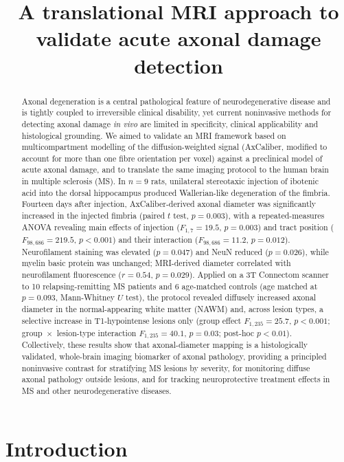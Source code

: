 \documentclass[11pt]{article}
\title{A translational MRI approach to validate acute axonal damage detection}
\date{}
\begin{document}
\maketitle

\begin{abstract}
Axonal degeneration is a central pathological feature of neurodegenerative disease and is tightly coupled to irreversible clinical disability, yet current noninvasive methods for detecting axonal damage \emph{in vivo} are limited in specificity, clinical applicability and histological grounding. We aimed to validate an MRI framework based on multicompartment modelling of the diffusion-weighted signal (AxCaliber, modified to account for more than one fibre orientation per voxel) against a preclinical model of acute axonal damage, and to translate the same imaging protocol to the human brain in multiple sclerosis (MS). In $n=9$ rats, unilateral stereotaxic injection of ibotenic acid into the dorsal hippocampus produced Wallerian-like degeneration of the fimbria. Fourteen days after injection, AxCaliber-derived axonal diameter was significantly increased in the injected fimbria (paired $t$ test, $p=0.003$), with a repeated-measures ANOVA revealing main effects of injection ($F_{1,7}=19.5$, $p=0.003$) and tract position ($F_{98,686}=219.5$, $p<0.001$) and their interaction ($F_{98,686}=11.2$, $p=0.012$). Neurofilament staining was elevated ($p=0.047$) and NeuN reduced ($p=0.026$), while myelin basic protein was unchanged; MRI-derived diameter correlated with neurofilament fluorescence ($r=0.54$, $p=0.029$). Applied on a 3T Connectom scanner to 10 relapsing-remitting MS patients and 6 age-matched controls (age matched at $p=0.093$, Mann-Whitney $U$ test), the protocol revealed diffusely increased axonal diameter in the normal-appearing white matter (NAWM) and, across lesion types, a selective increase in T1-hypointense lesions only (group effect $F_{1,235}=25.7$, $p<0.001$; group~$\times$~lesion-type interaction $F_{1,235}=40.1$, $p=0.03$; post-hoc $p<0.01$). Collectively, these results show that axonal-diameter mapping is a histologically validated, whole-brain imaging biomarker of axonal pathology, providing a principled noninvasive contrast for stratifying MS lesions by severity, for monitoring diffuse axonal pathology outside lesions, and for tracking neuroprotective treatment effects in MS and other neurodegenerative diseases.
\end{abstract}

\section{Introduction}
\end{document}
